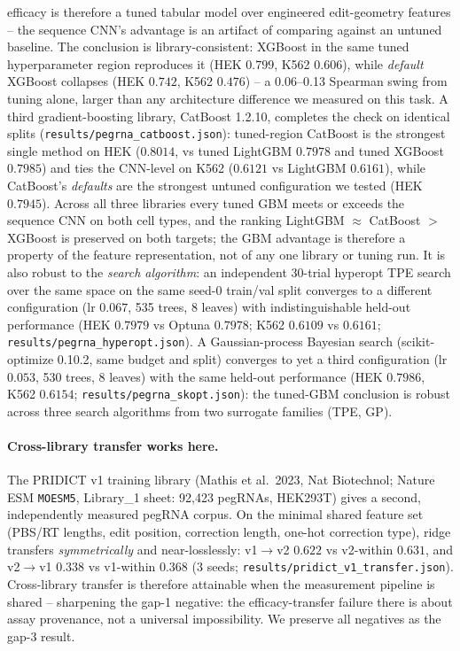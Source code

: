 \documentclass[12pt]{article}
\begin{document}
efficacy is therefore a tuned tabular model over engineered edit-geometry
features -- the sequence CNN's advantage is an artifact of comparing
against an untuned baseline. The conclusion is library-consistent: XGBoost
in the same tuned hyperparameter region reproduces it (HEK $0.799$, K562
$0.606$), while \emph{default} XGBoost collapses (HEK $0.742$, K562
$0.476$) -- a 0.06--0.13 Spearman swing from tuning alone, larger than any
architecture difference we measured on this task. A third gradient-boosting
library, CatBoost 1.2.10, completes the check on identical splits
(\texttt{results/pegrna\_catboost.json}): tuned-region CatBoost is the
strongest single method on HEK ($0.8014$, vs tuned LightGBM $0.7978$ and
tuned XGBoost $0.7985$) and ties the CNN-level on K562 ($0.6121$ vs
LightGBM $0.6161$), while CatBoost's \emph{defaults} are the strongest
untuned configuration we tested (HEK $0.7945$). Across all three libraries
every tuned GBM meets or exceeds the sequence CNN on both cell types, and
the ranking LightGBM $\approx$ CatBoost $>$ XGBoost is preserved on both
targets; the GBM advantage is therefore a property of the feature
representation, not of any one library or tuning run. It is also robust to
the \emph{search algorithm}: an independent 30-trial hyperopt TPE search
over the same space on the same seed-0 train/val split converges to a
different configuration (lr $0.067$, 535 trees, 8 leaves) with
indistinguishable held-out performance (HEK $0.7979$ vs Optuna $0.7978$;
K562 $0.6109$ vs $0.6161$; \texttt{results/pegrna\_hyperopt.json}). A
Gaussian-process Bayesian search (scikit-optimize 0.10.2, same budget and
split) converges to yet a third configuration (lr $0.053$, 530 trees, 8
leaves) with the same held-out performance (HEK $0.7986$, K562 $0.6154$;
\texttt{results/pegrna\_skopt.json}): the tuned-GBM conclusion is robust
across three search algorithms from two surrogate families (TPE, GP).

\paragraph{Cross-library transfer works here.} The PRIDICT v1 training
library (Mathis et al.\ 2023, Nat Biotechnol; Nature ESM
\texttt{MOESM5}, Library\_1 sheet: 92{,}423 pegRNAs, HEK293T) gives a
second, independently measured pegRNA corpus. On the minimal shared
feature set (PBS/RT lengths, edit position, correction length,
one-hot correction type), ridge transfers \emph{symmetrically} and
near-losslessly: v1$\to$v2 $0.622$ vs v2-within $0.631$, and
v2$\to$v1 $0.338$ vs v1-within $0.368$ (3 seeds;
\texttt{results/pridict\_v1\_transfer.json}). Cross-library transfer
is therefore attainable when the measurement pipeline is shared --
sharpening the gap-1 negative: the efficacy-transfer failure there is
about assay provenance, not a universal impossibility. We preserve all
negatives as the gap-3 result.
\end{document}
